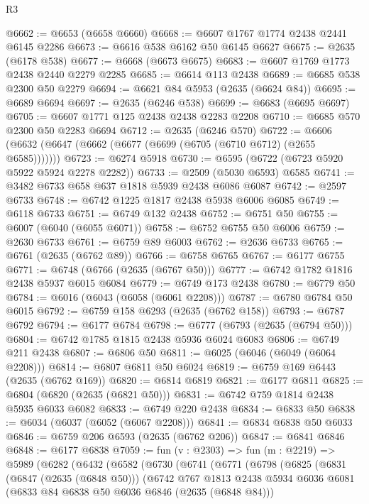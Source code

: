\begin{lexlean}{R3}
\begin{coremodule}
@6662 := @6653 (@6658 @6660)
@6668 := @6607 @1767 @1774 @2438 @2441 @6145 @2286
@6673 := @6616 @538 @6162 @50 @6145 @6627
@6675 := @2635 (@6178 @538)
@6677 := @6668 (@6673 @6675)
@6683 := @6607 @1769 @1773 @2438 @2440 @2279 @2285
@6685 := @6614 @113 @2438
@6689 := @6685 @538 @2300 @50 @2279
@6694 := @6621 @84 @5953 (@2635 (@6624 @84))
@6695 := @6689 @6694
@6697 := @2635 (@6246 @538)
@6699 := @6683 (@6695 @6697)
@6705 := @6607 @1771 @125 @2438 @2438 @2283 @2208
@6710 := @6685 @570 @2300 @50 @2283 @6694
@6712 := @2635 (@6246 @570)
@6722 := @6606 (@6632 (@6647 (@6662 (@6677 (@6699 (@6705 (@6710 @6712) (@2655 @6585)))))))
@6723 := @6274 @5918
@6730 := @6595 (@6722 (@6723 @5920 @5922 @5924 @2278 @2282))
@6733 := @2509 (@5030 @6593) @6585
@6741 := @3482 @6733 @658 @637 @1818 @5939 @2438 @6086 @6087
@6742 := @2597 @6733
@6748 := @6742 @1225 @1817 @2438 @5938 @6006 @6085
@6749 := @6118 @6733
@6751 := @6749 @132 @2438
@6752 := @6751 @50
@6755 := @6007 (@6040 (@6055 @6071))
@6758 := @6752 @6755 @50 @6006
@6759 := @2630 @6733
@6761 := @6759 @89 @6003
@6762 := @2636 @6733
@6765 := @6761 (@2635 (@6762 @89))
@6766 := @6758 @6765
@6767 := @6177 @6755
@6771 := @6748 (@6766 (@2635 (@6767 @50)))
@6777 := @6742 @1782 @1816 @2438 @5937 @6015 @6084
@6779 := @6749 @173 @2438
@6780 := @6779 @50
@6784 := @6016 (@6043 (@6058 (@6061 @2208)))
@6787 := @6780 @6784 @50 @6015
@6792 := @6759 @158 @6293 (@2635 (@6762 @158))
@6793 := @6787 @6792
@6794 := @6177 @6784
@6798 := @6777 (@6793 (@2635 (@6794 @50)))
@6804 := @6742 @1785 @1815 @2438 @5936 @6024 @6083
@6806 := @6749 @211 @2438
@6807 := @6806 @50
@6811 := @6025 (@6046 (@6049 (@6064 @2208)))
@6814 := @6807 @6811 @50 @6024
@6819 := @6759 @169 @6443 (@2635 (@6762 @169))
@6820 := @6814 @6819
@6821 := @6177 @6811
@6825 := @6804 (@6820 (@2635 (@6821 @50)))
@6831 := @6742 @759 @1814 @2438 @5935 @6033 @6082
@6833 := @6749 @220 @2438
@6834 := @6833 @50
@6838 := @6034 (@6037 (@6052 (@6067 @2208)))
@6841 := @6834 @6838 @50 @6033
@6846 := @6759 @206 @6593 (@2635 (@6762 @206))
@6847 := @6841 @6846
@6848 := @6177 @6838
@7059 := fun (v : @2303) =>
  fun (m : @2219) =>
  @5989
    (@6282
      (@6432
        (@6582
          (@6730
            (@6741
              (@6771
                (@6798
                  (@6825
                    (@6831
                      (@6847 (@2635 (@6848 @50)))
                      (@6742
                        @767
                        @1813
                        @2438
                        @5934
                        @6036
                        @6081
                        (@6833 @84 @6838 @50 @6036 @6846 (@2635 (@6848 @84)))

\end{coremodule}
\end{lexlean}
